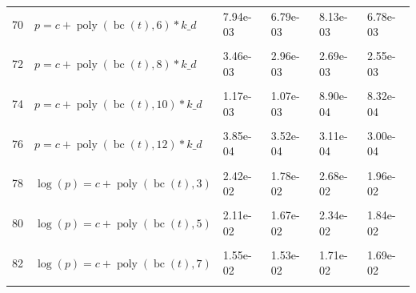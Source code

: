 \documentclass[12pt,a4paper]{article}
\DeclareMathOperator{\bc}{bc}
\DeclareMathOperator{\poly}{poly}
\begin{document}
\begin{longtable}[t]{ll>{\raggedleft\arraybackslash}p{2cm}>{\raggedleft\arraybackslash}p{2cm}>{\raggedleft\arraybackslash}p{2cm}>{\raggedleft\arraybackslash}p{2cm}}
70 & $p = c + \poly\left( \bc(t), 6 \right) * k\_d$ & 7.94e-03 & 6.79e-03 & 8.13e-03 & 6.78e-03\\
\cellcolor{gray!6}{71} & \cellcolor{gray!6}{$p = c + \poly\left( \bc(t), 7 \right) * k\_d$} & \cellcolor{gray!6}{6.45e-03} & \cellcolor{gray!6}{5.21e-03} & \cellcolor{gray!6}{5.12e-03} & \cellcolor{gray!6}{4.69e-03}\\
72 & $p = c + \poly\left( \bc(t), 8 \right) * k\_d$ & 3.46e-03 & 2.96e-03 & 2.69e-03 & 2.55e-03\\
\cellcolor{gray!6}{73} & \cellcolor{gray!6}{$p = c + \poly\left( \bc(t), 9 \right) * k\_d$} & \cellcolor{gray!6}{3.18e-03} & \cellcolor{gray!6}{2.83e-03} & \cellcolor{gray!6}{2.94e-03} & \cellcolor{gray!6}{2.72e-03}\\
74 & $p = c + \poly\left( \bc(t), 10 \right) * k\_d$ & 1.17e-03 & 1.07e-03 & 8.90e-04 & 8.32e-04\\
\cellcolor{gray!6}{75} & \cellcolor{gray!6}{$p = c + \poly\left( \bc(t), 11 \right) * k\_d$} & \cellcolor{gray!6}{1.05e-03} & \cellcolor{gray!6}{9.38e-04} & \cellcolor{gray!6}{9.59e-04} & \cellcolor{gray!6}{8.50e-04}\\
76 & $p = c + \poly\left( \bc(t), 12 \right) * k\_d$ & 3.85e-04 & 3.52e-04 & 3.11e-04 & 3.00e-04\\
\cellcolor{gray!6}{77} & \cellcolor{gray!6}{$p = c + \poly\left( \bc(t), 13 \right) * k\_d$} & \cellcolor{gray!6}{3.47e-04} & \cellcolor{gray!6}{3.22e-04} & \cellcolor{gray!6}{3.17e-04} & \cellcolor{gray!6}{3.00e-04}\\
78 & $\log(p) = c + \poly\left( \bc(t), 3 \right)$ & 2.42e-02 & 1.78e-02 & 2.68e-02 & 1.96e-02\\
\cellcolor{gray!6}{79} & \cellcolor{gray!6}{$\log(p) = c + \poly\left( \bc(t), 4 \right)$} & \cellcolor{gray!6}{2.90e-02} & \cellcolor{gray!6}{2.79e-02} & \cellcolor{gray!6}{3.22e-02} & \cellcolor{gray!6}{3.10e-02}\\
80 & $\log(p) = c + \poly\left( \bc(t), 5 \right)$ & 2.11e-02 & 1.67e-02 & 2.34e-02 & 1.84e-02\\
\cellcolor{gray!6}{81} & \cellcolor{gray!6}{$\log(p) = c + \poly\left( \bc(t), 6 \right)$} & \cellcolor{gray!6}{1.81e-02} & \cellcolor{gray!6}{1.61e-02} & \cellcolor{gray!6}{2.00e-02} & \cellcolor{gray!6}{1.77e-02}\\
82 & $\log(p) = c + \poly\left( \bc(t), 7 \right)$ & 1.55e-02 & 1.53e-02 & 1.71e-02 & 1.69e-02\\
\cellcolor{gray!6}{83} & \cellcolor{gray!6}{$\log(p) = c + \poly\left( \bc(t), 8 \right)$} & \cellcolor{gray!6}{1.79e-02} & \cellcolor{gray!6}{1.56e-02} & \cellcolor{gray!6}{1.98e-02} & \cellcolor{gray!6}{1.72e-02}\\

\end{longtable}
\end{document}
